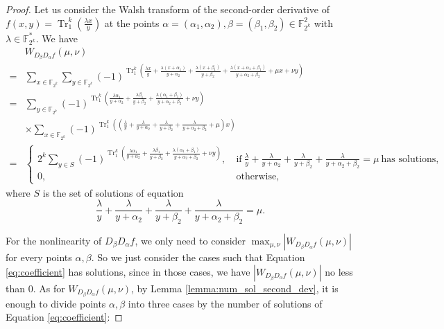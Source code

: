 \documentclass{article}
\newcommand{\F}{\mathbb{F}}
\newcommand{\0}{\textbf{0}}
\newcommand{\1}{\textbf{1}}
\newcommand{\TRACE}{\operatorname{Tr}_1^k}
\theoremstyle{plain}
\begin{document}
    \begin{proof}
        Let us consider the Walsh transform of the second-order derivative of $f(x,y)=\TRACE\left(\frac{\lambda x}{y}\right)$ at the points $\alpha=(\alpha_1,\alpha_2),\beta=(\beta_1,\beta_2)\in\F_{2^k}^2$ with $\lambda\in\F_{2^k}^*$.
        We have
        \begin{align*}\label{eq:secondordersum}
            &W_{D_{\beta}D_{\alpha}f}(\mu,\nu)\nonumber\\
            =&\sum_{x\in\F_{2^k}}\sum_{y\in\F_{2^k}}(-1)^{\TRACE\left(\frac{\lambda x}{y}+\frac{\lambda (x+\alpha_1)}{y+\alpha_2}+\frac{\lambda (x+\beta_1)}{y+\beta_2}+\frac{\lambda (x+\alpha_1+\beta_1)}{y+\alpha_2+\beta_2}+\mu x+\nu y\right)}\nonumber\\
            =&\sum_{y\in\F_{2^k}}(-1)^{\TRACE\left(\frac{\lambda\alpha_1}{y+\alpha_2}+\frac{\lambda\beta_1}{y+\beta_2}+\frac{\lambda(\alpha_1+\beta_1)}{y+\alpha_2+\beta_2}+\nu y\right)}\nonumber\\
            &\times \sum_{x\in\F_{2^k}}(-1)^{\TRACE\left(\left(\frac{\lambda}{y}+\frac{\lambda}{y+\alpha_2}+\frac{\lambda}{y+\beta_2}+\frac{\lambda}{y+\alpha_2+\beta_2}+\mu\right)x\right)}\nonumber\\
            =&\begin{cases}
                2^k\sum_{y\in S}(-1)^{\TRACE\left(\frac{\lambda\alpha_1}{y+\alpha_2}+\frac{\lambda\beta_1}{y+\beta_2}+\frac{\lambda(\alpha_1+\beta_1)}{y+\alpha_2+\beta_2}+\nu y\right)},&~\text{if}~\frac{\lambda}{y}+\frac{\lambda}{y+\alpha_2}+\frac{\lambda}{y+\beta_2}+\frac{\lambda}{y+\alpha_2+\beta_2}=\mu~\text{has solutions},\\
                0, &~\text{otherwise},
            \end{cases}
        \end{align*}
        where $S$ is the set of solutions of equation
        \begin{equation}\label{eq:coefficient}
            \frac{\lambda}{y}+\frac{\lambda}{y+\alpha_2}+\frac{\lambda}{y+\beta_2}+\frac{\lambda}{y+\alpha_2+\beta_2}=\mu.
        \end{equation}

        For the nonlinearity of $D_{\beta}D_{\alpha}f$, we only need to consider $\max_{\mu,\nu}|W_{D_{\beta}D_{\alpha}f}(\mu,\nu)|$ for every points $\alpha,\beta$.
        So we just consider the cases such that Equation \eqref{eq:coefficient} has solutions, since in those cases, we have $\left\lvert W_{D_{\beta}D_{\alpha}f}(\mu,\nu)\right\rvert$ no less than $0$.
        As for $W_{D_{\beta}D_{\alpha}f}(\mu,\nu)$, by Lemma \ref{lemma:num_sol_second_dev}, it is enough to divide points $\alpha,\beta$ into three cases by the number of solutions
        of Equation \eqref{eq:coefficient}:


\end{proof}
\end{document}
